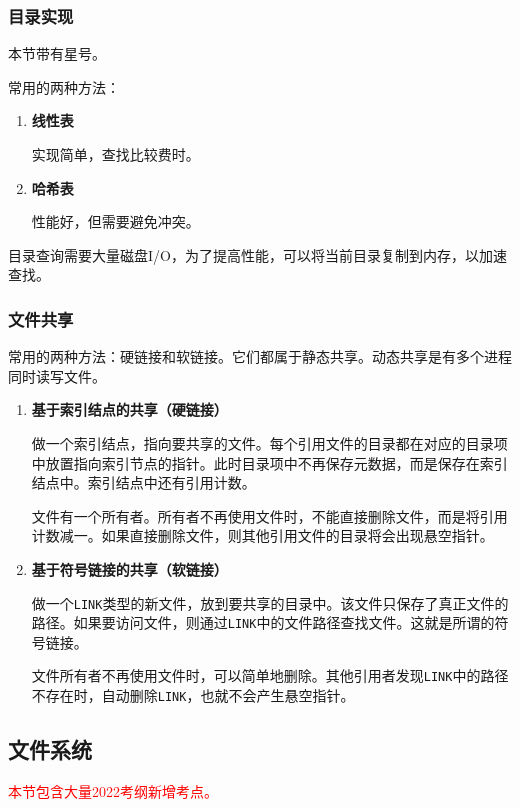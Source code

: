 \documentclass[12pt, a4paper, oneside]{ctexart}
\begin{document}
\subsubsection{目录实现}

本节带有星号。

常用的两种方法：
\begin{enumerate}
  \item {\bf 线性表}
  
  实现简单，查找比较费时。

  \item {\bf 哈希表}
  
  性能好，但需要避免冲突。
\end{enumerate}

目录查询需要大量磁盘I/O，为了提高性能，可以将当前目录复制到内存，以加速查找。

\subsubsection{文件共享}

常用的两种方法：硬链接和软链接。它们都属于静态共享。动态共享是有多个进程同时读写文件。
\begin{enumerate}
  \item {\bf 基于索引结点的共享（硬链接）}
  
  做一个索引结点，指向要共享的文件。每个引用文件的目录都在对应的目录项中放置指向索引节点的指针。此时目录项中不再保存元数据，而是保存在索引结点中。索引结点中还有引用计数。

  文件有一个所有者。所有者不再使用文件时，不能直接删除文件，而是将引用计数减一。如果直接删除文件，则其他引用文件的目录将会出现悬空指针。

  \item {\bf 基于符号链接的共享（软链接）}
  
  做一个\verb|LINK|类型的新文件，放到要共享的目录中。该文件只保存了真正文件的路径。如果要访问文件，则通过\verb|LINK|中的文件路径查找文件。这就是所谓的符号链接。

  文件所有者不再使用文件时，可以简单地删除。其他引用者发现\verb|LINK|中的路径不存在时，自动删除\verb|LINK|，也就不会产生悬空指针。
\end{enumerate}

\subsection{文件系统}

\textcolor{red}{本节包含大量2022考纲新增考点。}
\end{document}
